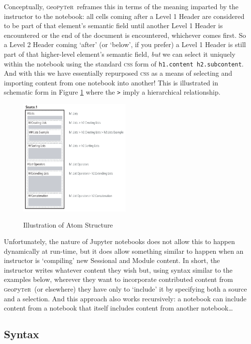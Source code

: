 \documentclass[letter, 11pt,titlepage]{article}
\newcommand{\gp}{\textsc{g}eo\textsc{p}y\textsc{t}e\textsc{r}~\/}
\begin{document}
Conceptually, \gp reframes this in terms of the meaning imparted by the instructor to the notebook: all cells coming after a Level 1 Header are considered to be part of that element's semantic field until another Level 1 Header is encountered or the end of the document is encountered, whichever comes first. So a Level 2 Header coming `after' (or `below', if you prefer) a Level 1 Header is still part of that higher-level element's semantic field, \textit{but} we can select it uniquely within the notebook using the standard \textsc{css} form of \texttt{h1.content h2.subcontent}. And with this we have essentially repurposed \textsc{css} as a means of selecting and importing content from one notebook into another! This is illustrated in schematic form in Figure \ref{fig:structure} where the \texttt{>} imply a hierarchical relationship.

\begin{figure}
  \centering
  \caption{Illustration of Atom Structure}
  \includegraphics[width=0.5\textwidth]{Single_Document.pdf}
  \label{fig:structure}
\end{figure}

Unfortunately, the nature of Jupyter notebooks does not allow this to happen dynamically at run-time, but it does allow something similar to happen when an instructor is `compiling' new Sessional and Module content. In short, the instructor writes whatever content they wish but, using syntax similar to the examples below, wherever they want to incorporate contributed content from \gp (or elsewhere) they have only to `include' it by specifying both a source and a selection. And this approach also works recursively: a notebook can include content from a notebook that itself includes content from another notebook\ldots

\subsection{Syntax}\label{syntax}
\end{document}
